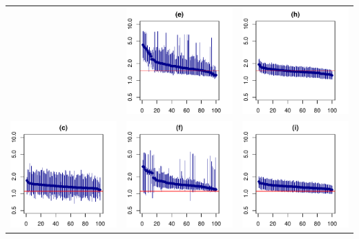 \documentclass{standalone}
\begin{document}
\begin{tabular}{ccc}
 & \includegraphics[width=6.3cm]{Fig3_e.pdf}
 & \includegraphics[width=6.3cm]{Fig3_h.pdf} \\
\includegraphics[width=6.3cm]{Fig3_c.pdf}
 & \includegraphics[width=6.3cm]{Fig3_f.pdf}
 & \includegraphics[width=6.3cm]{Fig3_i.pdf}

\end{tabular}
\end{document}
